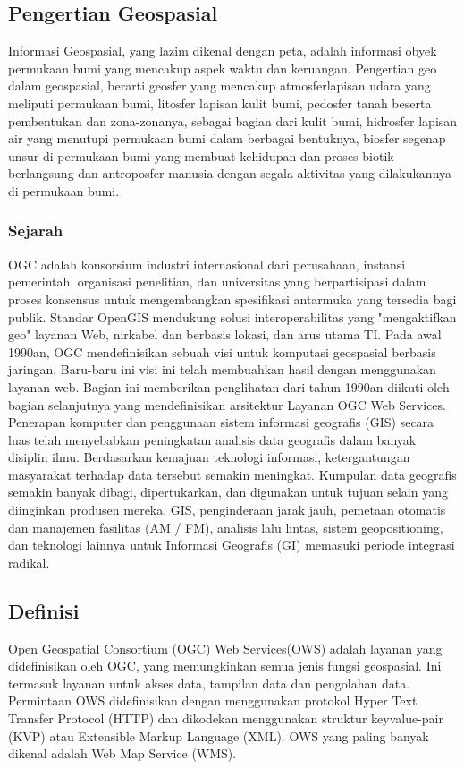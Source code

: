 \subsection{Pengertian Geospasial} Informasi Geospasial, yang lazim dikenal dengan peta, adalah informasi
obyek permukaan bumi yang mencakup aspek waktu dan keruangan. Pengertian
geo dalam geospasial, berarti geosfer yang mencakup atmosferlapisan udara
yang meliputi permukaan bumi, litosfer lapisan kulit bumi, pedosfer tanah
beserta pembentukan dan zona-zonanya, sebagai bagian dari kulit bumi,
hidrosfer lapisan air yang menutupi permukaan bumi dalam berbagai bentuknya,
biosfer segenap unsur di permukaan bumi yang membuat kehidupan dan proses
biotik berlangsung dan antroposfer manusia dengan segala aktivitas yang
dilakukannya di permukaan bumi.

\subsubsection{Sejarah}
\cite{lupp2008open} OGC adalah konsorsium industri internasional dari perusahaan, instansi pemerintah, organisasi penelitian, 
dan universitas yang berpartisipasi dalam proses konsensus untuk mengembangkan spesifikasi antarmuka yang tersedia bagi publik. 
Standar OpenGIS mendukung solusi interoperabilitas yang "mengaktifkan geo" layanan Web, nirkabel dan berbasis lokasi, dan arus utama TI. 
Pada awal 1990an, OGC mendefinisikan sebuah visi untuk komputasi geospasial berbasis jaringan. 
Baru-baru ini visi ini telah membuahkan hasil dengan menggunakan layanan web. 
Bagian ini memberikan penglihatan dari tahun 1990an diikuti oleh bagian selanjutnya yang mendefinisikan arsitektur Layanan OGC Web Services. Penerapan komputer dan penggunaan sistem informasi geografis (GIS) secara luas telah menyebabkan peningkatan analisis data geografis dalam banyak disiplin ilmu. Berdasarkan kemajuan teknologi informasi, ketergantungan masyarakat terhadap data tersebut semakin meningkat. Kumpulan data geografis semakin banyak dibagi, dipertukarkan, dan digunakan untuk tujuan
selain yang diinginkan produsen mereka. GIS, penginderaan jarak jauh, pemetaan otomatis dan manajemen fasilitas (AM / FM), 
analisis lalu lintas, sistem geopositioning, dan teknologi lainnya untuk Informasi Geografis (GI) memasuki periode integrasi radikal.

\subsection{Definisi}
\cite{lupp2008open} Open Geospatial Consortium (OGC) Web Services(OWS) adalah layanan yang didefinisikan oleh OGC, 
yang memungkinkan semua jenis fungsi geospasial. 
Ini termasuk layanan untuk akses data, tampilan data dan pengolahan data. 
Permintaan OWS didefinisikan dengan menggunakan protokol Hyper Text Transfer Protocol (HTTP) 
dan dikodekan menggunakan struktur keyvalue-pair (KVP) atau Extensible Markup Language (XML). 
OWS yang paling banyak dikenal adalah Web Map Service (WMS).

